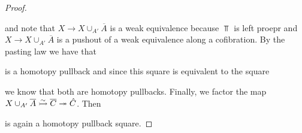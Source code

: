 \begin{lemma}
\begin{proof}
\begin{center}
\begin{tikzcd} [sep = 4em]
            \end{tikzcd}
        \end{center}
        and note that $X\to X\cup_{A'}\overline{A}$ is a weak equivalence because $\Top$ is left proepr and $X\to X\cup_{A'}\overline{A}$ is a pushout of a weak equivalence along a cofibration.
        By the pasting law we have that
        \begin{center}
        \end{center}
        is a homotopy pullback and since this square is equivalent to the square
        \begin{center}
        \end{center}
        we know that both are homotopy pullbacks.
        Finally, we factor the map $X\cup_{A'}\overline{A}\xtailrightarrow[]{\sim}\overline{C}\xtwoheadrightarrow{}\hat{C}$.
        Then 
        \begin{center}
        \end{center}
        is again a homotopy pullback square.


\end{proof}
\end{lemma}
